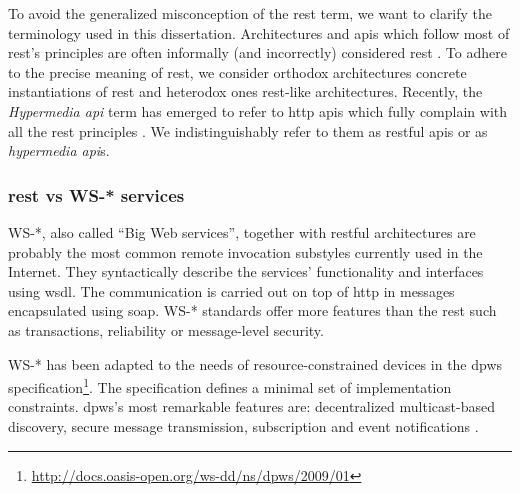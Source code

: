 To avoid the generalized misconception of the \ac{rest} term, we want to clarify the terminology used in this dissertation.
Architectures and \ac{api}s which follow most of \ac{rest}'s principles are often informally (and incorrectly) considered \ac{rest} \citep{fielding_rest_2008,moore_hypermedia_2010,klabnik_nobody_2011}.
To adhere to the precise meaning of \ac{rest}, we consider orthodox architectures concrete instantiations of \ac{rest} and heterodox ones \ac{rest}-like architectures.
Recently, the \emph{Hypermedia \ac{api}} term has emerged to refer to \acs{http} \ac{api}s which fully complain with all the \ac{rest} principles \citep{klabnik_rest_2012,moore_hypermedia_2010,amundsen_building_2011}.  %
We indistinguishably refer to them as \ac{rest}ful \ac{api}s or as \emph{hypermedia \ac{api}}s.


\subsubsection{\ac{rest} vs WS-* services}
\label{sec:protocols}

WS-*, also called ``Big Web services'', together with \acs{rest}ful architectures are probably the most common remote invocation substyles currently used in the Internet.
They syntactically describe the services' functionality and interfaces using \ac{wsdl}.
The communication is carried out on top of \ac{http} in messages encapsulated using \ac{soap}.
WS-* standards offer more features than the \ac{rest} such as transactions, reliability or message-level security.


WS-* has been adapted to the needs of resource-constrained devices in the \ac{dpws} specification\footnote{\url{http://docs.oasis-open.org/ws-dd/ns/dpws/2009/01}}. %
The specification defines a minimal set of implementation constraints.
\ac{dpws}'s most remarkable features are: decentralized multicast-based discovery, secure message transmission, subscription and event notifications \citep{moritz_devices_2010}.


